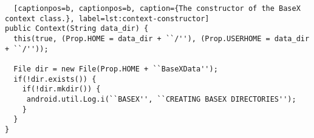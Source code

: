 \begin{lstlisting}	[captionpos=b, captionpos=b, caption={The constructor of the BaseX context class.}, label=lst:context-constructor] 		        	   
public Context(String data_dir) {
  this(true, (Prop.HOME = data_dir + ``/''), (Prop.USERHOME = data_dir + ``/''));
        	
  File dir = new File(Prop.HOME + ``BaseXData'');
  if(!dir.exists()) {
    if(!dir.mkdir()) {
     android.util.Log.i(``BASEX'', ``CREATING BASEX DIRECTORIES'');
    }  
  }
}
\end{lstlisting} 
